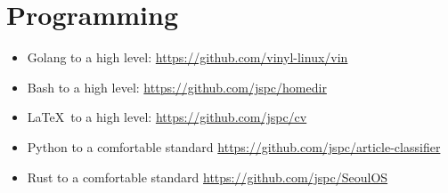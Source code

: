 \section{Programming}

\begin{itemize}
\item Golang to a high level: \href{https://github.com/vinyl-linux/vin}{https://github.com/vinyl-linux/vin}
\item Bash to a high level: \href{https://github.com/jspc/homedir}{https://github.com/jspc/homedir}
\item \LaTeX \ to a high level: \href{https://github.com/jspc/cv}{https://github.com/jspc/cv}
\item Python to a comfortable standard \href{https://github.com/jspc/article-classifier}{https://github.com/jspc/article-classifier}
\item Rust to a comfortable standard \href{https://github.com/jspc/SeoulOS}{https://github.com/jspc/SeoulOS}
\end{itemize}
